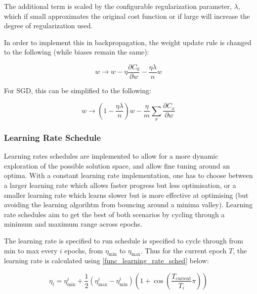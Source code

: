 \documentclass[a4paper,latin]{paper}
\begin{document}
The additional term is scaled by the configurable regularization parameter, $\lambda$, which if small approximates the original cost function or if large will increase the degree of regularization used. \newline

In order to implement this in backpropagation, the weight update rule is changed to the following (while biases remain the same):

\begin{equation}\label{func_l2_weight_update}
w \rightarrow w-\eta \frac{\partial C_{0}}{\partial w}-\frac{\eta \lambda}{n} w
\end{equation}

For SGD, this can be simplified to the following: 

\begin{equation}\label{func_sgd_l2}
w \rightarrow\left(1-\frac{\eta \lambda}{n}\right) w-\frac{\eta}{m} \sum_{x} \frac{\partial C_{x}}{\partial w}
\end{equation}


\subsubsection{Learning Rate Schedule}\label{imp_learning_rate_schedule}

Learning rates schedules are implemented to allow for a more dynamic exploration of the possible solution space, and allow fine tuning around an optima. With a constant learning rate implementation, one has to choose between a larger learning rate which allows faster progress but less optimisation, or a smaller learning rate which learns slower but is more effective at optimising (but avoiding the learning algorihtm from bouncing around a minima valley). Learning rate schedules aim to get the best of both scenarios by cycling through a minimum and maximum range across epochs.\newline

The learning rate is specified to run schedule is specified to cycle through from min to max every $i$ epochs, from $\eta_{\min}$ to $\eta_{\max}$. Thus for the current epoch $T$, the learning rate is calculated using \ref{func_learning_rate_sched} below:

\begin{equation}\label{func_learning_rate_sched}
\eta_{t}=\eta_{\min }^{i}+\frac{1}{2}\left(\eta_{\max }^{i}-\eta_{\min }^{i}\right)\left(1+\cos \left(\frac{T_{\text {current}}}{T_{i}} \pi\right)\right)
\end{equation}
\end{document}
